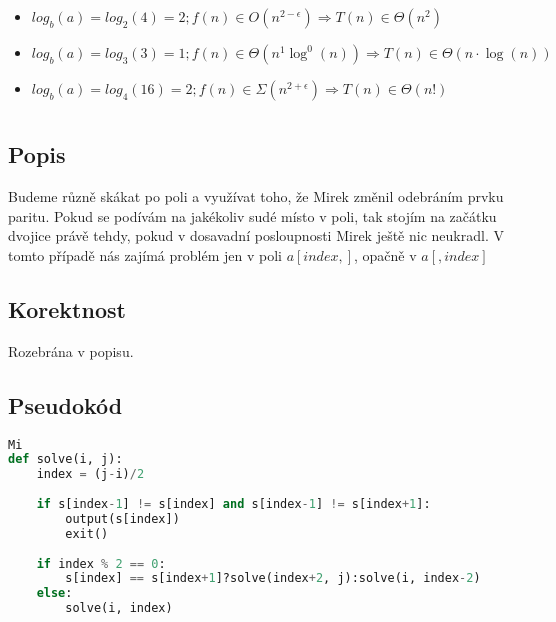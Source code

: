 \documentclass[a4paper]{article}
\begin{document}
\text{}\vspace{-0.1cm}
{\fontsize{12}{15}\selectfont \hspace{-0.5cm}}

\section{}
\begin{itemize}
	\item $log_b(a) = log_2(4) = 2; f(n) \in O(n^{2 - \epsilon}) \Rightarrow T(n) \in \Theta(n^2)$
	\item $log_b(a) = log_3(3) = 1; f(n) \in \Theta(n^1\log^0(n)) \Rightarrow T(n) \in \Theta(n \cdot \log(n))$
	\item $log_b(a) = log_4(16) = 2; f(n) \in \Sigma(n^{2 + \epsilon}) \Rightarrow T(n) \in \Theta(n!)$
\end{itemize}

\section{}
\subsection{Popis}
Budeme různě skákat po poli a využívat toho, že Mirek změnil odebráním prvku paritu. Pokud se podívám na jakékoliv sudé místo v poli, tak stojím na začátku dvojice právě tehdy, pokud v dosavadní posloupnosti Mirek ještě nic neukradl. V tomto případě nás zajímá problém jen v poli $a[index, ]$, opačně v $a[, index]$

\subsection{Korektnost}
Rozebrána v popisu.

\subsection{Pseudokód}
\begin{lstlisting}[language=Python]Mi
def solve(i, j):
	index = (j-i)/2
	
	if s[index-1] != s[index] and s[index-1] != s[index+1]:
		output(s[index])
		exit()
	
	if index % 2 == 0:
		s[index] == s[index+1]?solve(index+2, j):solve(i, index-2)
	else:
		solve(i, index)
\end{lstlisting}
\end{document}

